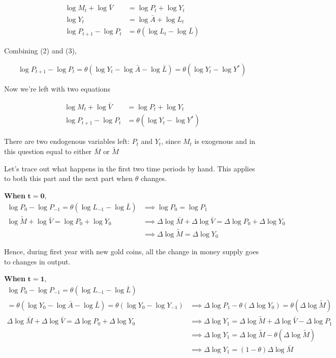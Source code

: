 \documentclass[11pt]{scrartcl}
\begin{document}
\begin{align}
\log{M_t} + \log{\bar{V}} &= \log{P_t} + \log{Y_t} \\
\log{Y_t} &= \log{\bar{A}} + \log{L_t} \\
\log{P_{t+1}} - \log{P_t} &= \theta (\log{L_t} - \log{\bar{L}}) 
\end{align}

Combining (2) and (3), 

\[\log{P_{t+1}} - \log{P_t} = \theta (\log{Y_t} - \log{\bar{A}} - \log{\bar{L}}) = \theta(\log{Y_t} - \log{Y^*})\]

Now we're left with two equations

\setcounter{equation}{0}

\begin{align}
\log{M_t} + \log{\bar{V}} &= \log{P_t} + \log{Y_t} \\
\log{P_{t+1}} - \log{P_t} &= \theta(\log{Y_t} - \log{Y^*})
\end{align}

There are two endogenous variables left: $P_t$ and $Y_t$, since $M_t$ is exogenous and in this question equal to either $\bar{M}$ or $\tilde{M}$

Let's trace out what happens in the first two time periods by hand. This applies to both this part and the next part when $\theta$ changes.

\textbf{When} $\mathbf{t=0}$, 
\begin{align*}
\log{P_0} - \log{P_{-1}} = \theta(\log{L_{-1}} - \log{\bar{L}}) &\implies \log{P_0} = \log{P_1} \\
\log{\tilde{M}} + \log{\bar{V}} = \log{P_0} + \log{Y_0} &\implies \Delta \log{\bar{M}} + \Delta \log{\bar{V}} = \Delta \log{P_0} + \Delta \log{Y_0} \\
&\implies \Delta \log{\tilde{M}} = \Delta \log{Y_0}
\end{align*}

Hence, during first year with new gold coins, all the change in money supply goes to changes in output.

\textbf{When} $\mathbf{t=1}$, 
\begin{align*}
\log{P_0} - \log{P_{-1}} = \theta(\log{L_{-1}} - \log{\bar{L}}) \\
= \theta(\log{Y_0} - \log{\bar{A}} - \log{\bar{L}}) = \theta(\log{Y_0} - \log{Y_{-1}}) &\implies \Delta \log{P_1} - \theta (\Delta \log{Y_0}) = \theta(\Delta \log{\tilde{M}}) \\
\Delta \log{\bar{M}} + \Delta \log{\bar{V}} = \Delta \log{P_0} + \Delta \log{Y_0} &\implies \Delta \log{Y_1} = \Delta \log{\tilde{M}} + \Delta \log{\bar{V}} - \Delta \log{P_1} \\
&\implies \Delta \log{Y_1} = \Delta \log{\tilde{M}} - \theta(\Delta \log{\tilde{M}}) \\
&\implies \Delta \log{Y_1} = (1-\theta) \Delta \log{\bar{M}}
\end{align*}
\end{document}
